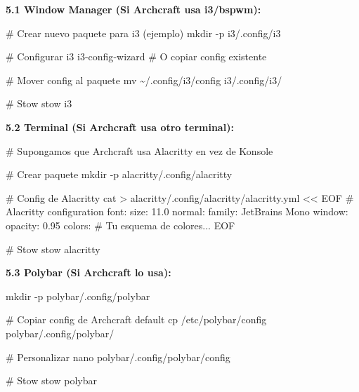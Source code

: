 \documentclass[
  doc,
  floatsintext,
  longtable,
  a4paper,
  nolmodern,
  notxfonts,
  notimes,
  12pt,
  colorlinks=true,linkcolor=blue,citecolor=blue,urlcolor=blue]{apa7}
\newenvironment{Shaded}{\begin{snugshade}}{\end{snugshade}}
\newcommand{\AttributeTok}[1]{\textcolor[rgb]{0.40,0.45,0.13}{#1}}
\newcommand{\CommentTok}[1]{\textcolor[rgb]{0.37,0.37,0.37}{#1}}
\newcommand{\ExtensionTok}[1]{\textcolor[rgb]{0.00,0.23,0.31}{#1}}
\newcommand{\FunctionTok}[1]{\textcolor[rgb]{0.28,0.35,0.67}{#1}}
\newcommand{\NormalTok}[1]{\textcolor[rgb]{0.00,0.23,0.31}{#1}}
\newcommand{\OperatorTok}[1]{\textcolor[rgb]{0.37,0.37,0.37}{#1}}
\newcommand{\StringTok}[1]{\textcolor[rgb]{0.13,0.47,0.30}{#1}}
\begin{document}
\textbf{5.1 Window Manager (Si Archcraft usa i3/bspwm):}

\begin{Shaded}
\begin{Highlighting}[]
\CommentTok{\# Crear nuevo paquete para i3 (ejemplo)}
\FunctionTok{mkdir} \AttributeTok{{-}p}\NormalTok{ i3/.config/i3}

\CommentTok{\# Configurar i3}
\ExtensionTok{i3{-}config{-}wizard}
\CommentTok{\# O copiar config existente}

\CommentTok{\# Mover config al paquete}
\FunctionTok{mv}\NormalTok{ \textasciitilde{}/.config/i3/config i3/.config/i3/}

\CommentTok{\# Stow}
\ExtensionTok{stow}\NormalTok{ i3}
\end{Highlighting}
\end{Shaded}

\textbf{5.2 Terminal (Si Archcraft usa otro terminal):}

\begin{Shaded}
\begin{Highlighting}[]
\CommentTok{\# Supongamos que Archcraft usa Alacritty en vez de Konsole}

\CommentTok{\# Crear paquete}
\FunctionTok{mkdir} \AttributeTok{{-}p}\NormalTok{ alacritty/.config/alacritty}

\CommentTok{\# Config de Alacritty}
\FunctionTok{cat} \OperatorTok{\textgreater{}}\NormalTok{ alacritty/.config/alacritty/alacritty.yml }\OperatorTok{\textless{}\textless{} \textquotesingle{}EOF\textquotesingle{}}
\StringTok{\# Alacritty configuration}
\StringTok{font:}
\StringTok{  size: 11.0}
\StringTok{  normal:}
\StringTok{    family: JetBrains Mono}
\StringTok{    }
\StringTok{window:}
\StringTok{  opacity: 0.95}
\StringTok{  }
\StringTok{colors:}
\StringTok{  \# Tu esquema de colores...}
\OperatorTok{EOF}

\CommentTok{\# Stow}
\ExtensionTok{stow}\NormalTok{ alacritty}
\end{Highlighting}
\end{Shaded}

\textbf{5.3 Polybar (Si Archcraft lo usa):}

\begin{Shaded}
\begin{Highlighting}[]
\FunctionTok{mkdir} \AttributeTok{{-}p}\NormalTok{ polybar/.config/polybar}

\CommentTok{\# Copiar config de Archcraft default}
\FunctionTok{cp}\NormalTok{ /etc/polybar/config polybar/.config/polybar/}

\CommentTok{\# Personalizar}
\FunctionTok{nano}\NormalTok{ polybar/.config/polybar/config}

\CommentTok{\# Stow}
\ExtensionTok{stow}\NormalTok{ polybar}
\end{Highlighting}
\end{Shaded}
\end{document}
